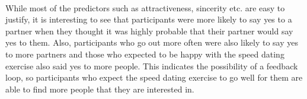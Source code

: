 \documentclass{article}
\begin{document}
\null\\
While most of the predictors such as attractiveness, sincerity etc. are easy to justify, it is interesting to see that participants were more likely to say yes to a partner when they thought it was highly probable that their partner would say yes to them. Also, participants who go out more often were also likely to say yes to more partners and those who expected to be happy with the speed dating exercise also said yes to more people. This indicates the possibility of a feedback loop, so participants who expect the speed dating exercise to go well for them are able to find more people that they are interested in.
\end{document}
